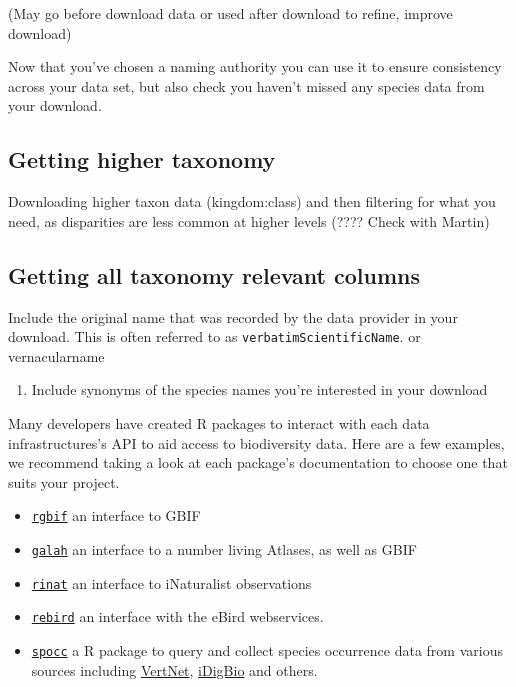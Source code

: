 \documentclass[
  letterpaper,
  DIV=11,
  numbers=noendperiod,
  oneside]{scrreprt}
\providecommand{\tightlist}{%
  \setlength{\itemsep}{0pt}\setlength{\parskip}{0pt}}\usepackage{longtable,booktabs,array}
\begin{document}
(May go before download data or used after download to refine, improve
download)

Now that you've chosen a naming authority you can use it to ensure
consistency across your data set, but also check you haven't missed any
species data from your download.

\hypertarget{getting-higher-taxonomy}{%
\subsection{Getting higher taxonomy}\label{getting-higher-taxonomy}}

Downloading higher taxon data (kingdom:class) and then filtering for
what you need, as disparities are less common at higher levels (????
Check with Martin)

\hypertarget{getting-all-taxonomy-relevant-columns}{%
\subsection{Getting all taxonomy relevant
columns}\label{getting-all-taxonomy-relevant-columns}}

Include the original name that was recorded by the data provider in your
download. This is often referred to as \texttt{verbatimScientificName}.
or vernacularname

\begin{enumerate}
\def\labelenumi{\arabic{enumi}.}
\setcounter{enumi}{1}
\tightlist
\item
  Include synonyms of the species names you're interested in your
  download
\end{enumerate}

Many developers have created R packages to interact with each data
infrastructures's API to aid access to biodiversity data. Here are a few
examples, we recommend taking a look at each package's documentation to
choose one that suits your project.

\begin{itemize}
\tightlist
\item
  \href{https://docs.ropensci.org/rgbif/}{\texttt{rgbif}} an interface
  to GBIF
\item
  \href{https://galah.ala.org.au/index.html}{\texttt{galah}} an
  interface to a number living Atlases, as well as GBIF
\item
  \href{https://docs.ropensci.org/rinat/}{\texttt{rinat}} an interface
  to iNaturalist observations
\item
  \href{https://docs.ropensci.org/rebird/}{\texttt{rebird}} an interface
  with the eBird webservices.
\item
  \href{https://docs.ropensci.org/spocc/}{\texttt{spocc}} a R package to
  query and collect species occurrence data from various sources
  including \href{https://github.com/ropensci/rvertnet}{VertNet},
  \href{http://www.idigbio.org/}{iDigBio} and others.
\end{itemize}
\end{document}
